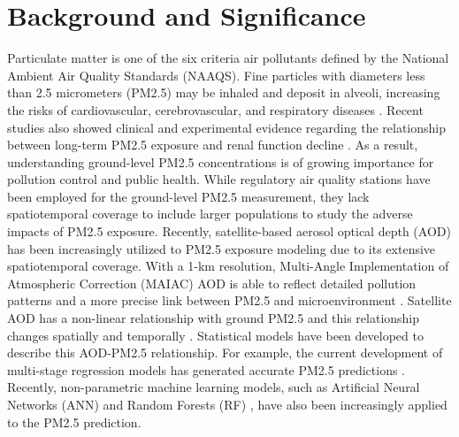\documentclass[11pt]{article}
\begin{document}
\section{Background and Significance}
Particulate matter is one of the six criteria air pollutants defined by the National Ambient Air Quality Standards (NAAQS). Fine particles with diameters less than 2.5 micrometers (PM2.5) may be inhaled and deposit in alveoli, increasing the risks of cardiovascular, cerebrovascular, and respiratory diseases \citep{Madrigano2013, Burnett2014, Bose2015, Sorek-Hamer2016}. Recent studies also showed clinical and experimental evidence regarding the relationship between long-term PM2.5 exposure and renal function decline \citep{Nemmar2009, Nemmar2016, Mehta2016, Bowe2018}. As a result, understanding ground-level PM2.5 concentrations is of growing importance for pollution control and public health. While regulatory air quality stations have been employed for the ground-level PM2.5 measurement, they lack spatiotemporal coverage to include larger populations to study the adverse impacts of PM2.5 exposure. Recently, satellite-based aerosol optical depth (AOD) has been increasingly utilized to PM2.5 exposure modeling due to its extensive spatiotemporal coverage. With a 1-km resolution, Multi-Angle Implementation of Atmospheric Correction (MAIAC) AOD is able to reflect detailed pollution patterns and a more precise link between PM2.5 and microenvironment \citep{Emili2011, Lyapustin2011, Lyapustin2012}. Satellite AOD has a non-linear relationship with ground PM2.5 and this relationship changes spatially and temporally \citep{Paciorek2009}. Statistical models have been developed to describe this AOD-PM2.5 relationship. For example, the current development of multi-stage regression models has generated accurate PM2.5 predictions \citep{Liu2009, Kloog2011, Kloog2012, Hu2014, Kloog2014, Ma2016}. Recently, non-parametric machine learning models, such as Artificial Neural Networks (ANN) \citep{Gupta2009, Zou2015, Di2016} and Random Forests (RF) \citep{Hu2017, Brokamp2018}, have also been increasingly applied to the PM2.5 prediction.  
\end{document}
